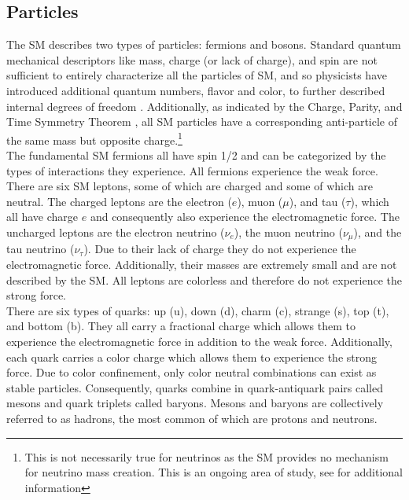 \subsection{Particles}\label{sec:particles}
The SM describes two types of particles: fermions and bosons. Standard quantum mechanical descriptors like mass, charge (or lack of charge), and spin are not sufficient to entirely characterize all the particles of SM, and so physicists have introduced additional quantum numbers, flavor and color, to further described internal degrees of freedom \cite{fundamental_interactions}. Additionally, as indicated by the Charge, Parity, and Time Symmetry Theorem \cite{cpt}, all SM particles have a corresponding anti-particle of the same mass but opposite charge.\footnote{This is not necessarily true for neutrinos as the SM provides no mechanism for neutrino mass creation. This is an ongoing area of study, see \cite{pdg} for additional information}\\

The fundamental SM fermions all have spin 1/2 and can be categorized by the types of interactions they experience. All fermions experience the weak force. There are six SM leptons, some of which are charged and some of which are neutral. The charged leptons are the electron ($e$), muon ($\mu$), and tau ($\tau$), which all have charge $e$ and consequently also experience the electromagnetic force. The uncharged leptons are the electron neutrino ($\nu_e$), the muon neutrino ($\nu_{\mu}$), and the tau neutrino ($\nu_{\tau}$). Due to their lack of charge they do not experience the electromagnetic force. Additionally, their masses are extremely small and are not described by the SM. All leptons are colorless and therefore do not experience the strong force.\\

There are six types of quarks: up (u), down (d), charm (c), strange (s), top (t), and bottom (b). They all carry a fractional charge which allows them to experience the electromagnetic force in addition to the weak force. Additionally, each quark carries a color charge which allows them to experience the strong force. Due to color confinement, only color neutral combinations can exist as stable particles. Consequently, quarks combine in quark-antiquark pairs called mesons and quark triplets called baryons. Mesons and baryons are collectively referred to as hadrons, the most common of which are protons and neutrons.\\

